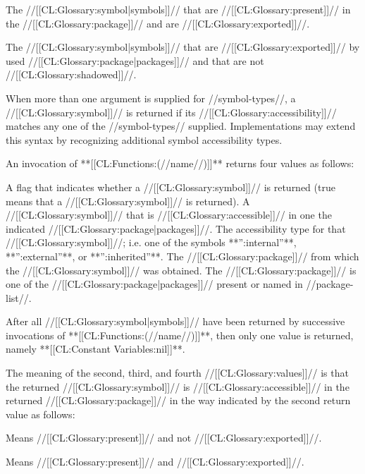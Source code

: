 The //[[CL:Glossary:symbol|symbols]]// that are //[[CL:Glossary:present]]// in the //[[CL:Glossary:package]]// and are //[[CL:Glossary:exported]]//.


The //[[CL:Glossary:symbol|symbols]]// that are //[[CL:Glossary:exported]]// by used //[[CL:Glossary:package|packages]]// and that are not //[[CL:Glossary:shadowed]]//. \endlist

When more than one argument is supplied for //symbol-types//, a //[[CL:Glossary:symbol]]// is returned if its //[[CL:Glossary:accessibility]]// matches any one of the //symbol-types// supplied. Implementations may extend this syntax by recognizing additional symbol accessibility types.

An invocation of **[[CL:Functions:(//name//)]]** returns four values as follows:

\beginlist {} A flag that indicates whether a //[[CL:Glossary:symbol]]// is returned (true means that a //[[CL:Glossary:symbol]]// is returned).  A //[[CL:Glossary:symbol]]// that is //[[CL:Glossary:accessible]]// in one the indicated //[[CL:Glossary:package|packages]]//.  The accessibility type for that //[[CL:Glossary:symbol]]//; i.e. one of the symbols **'':internal''**, **'':external''**, or **'':inherited''**.  The //[[CL:Glossary:package]]// from which the //[[CL:Glossary:symbol]]// was obtained. The //[[CL:Glossary:package]]// is one of the //[[CL:Glossary:package|packages]]// present or named in //package-list//. \endlist

After all //[[CL:Glossary:symbol|symbols]]// have been returned by successive invocations of **[[CL:Functions:(//name//)]]**, then only one value is returned, namely **[[CL:Constant Variables:nil]]**.

The meaning of the second, third, and fourth //[[CL:Glossary:values]]// is that the returned //[[CL:Glossary:symbol]]// is //[[CL:Glossary:accessible]]// in the returned //[[CL:Glossary:package]]// in the way indicated by the second return value as follows:

\beginlist {}

Means //[[CL:Glossary:present]]// and not //[[CL:Glossary:exported]]//.


Means //[[CL:Glossary:present]]// and //[[CL:Glossary:exported]]//.


